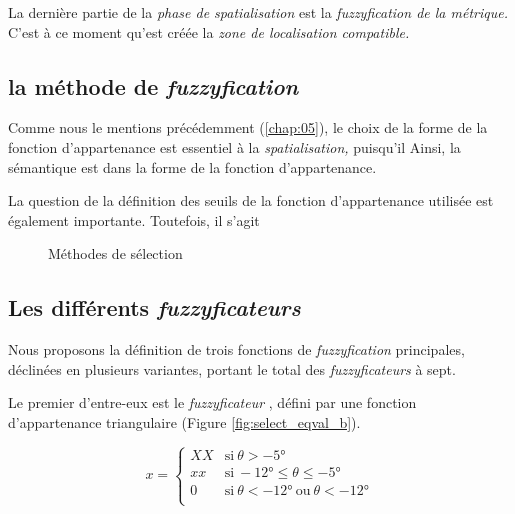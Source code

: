 La dernière partie de la \emph{phase de spatialisation} est la
\emph{fuzzyfication de la métrique.} C'est à ce moment qu'est créée la
\emph{zone de localisation compatible.}

\subsection{la méthode de \emph{fuzzyfication}}

%
Comme nous le mentions précédemment (\autoref{chap:05}), le choix de la forme de la fonction d'appartenance est essentiel à la \emph{spatialisation,} puisqu'il
%
Ainsi, la sémantique est dans la forme de la fonction d'appartenance.

%
La question de la définition des seuils de la fonction d'appartenance utilisée est également importante. Toutefois, il s'agit 

\begin{figure}
  \centering
  
  \caption{Méthodes de sélection}
  \label{fig:importance_fuzzyfication}
\end{figure}

\subsection{Les différents \emph{fuzzyficateurs}}


Nous proposons la définition de trois fonctions de \emph{fuzzyfication} principales, déclinées en plusieurs variantes, portant le total des \emph{fuzzyficateurs} à sept.

Le premier d'entre-eux est le \emph{fuzzyficateur} , défini par une fonction d'appartenance triangulaire (Figure \ref{fig:select_eqval_b}).

\begin{equation}
  \label{eq:eq_val}
  x = \left\{
    \begin{array}{ll}
      XX & \text{si}\ θ > -5° \\
      xx & \text{si}\ -12° ≤ θ ≤ -5° \\
      0 & \text{si}\ θ < -12°\ \text{ou}\ θ < -12°\\
    \end{array}
  \right.
\end{equation}


